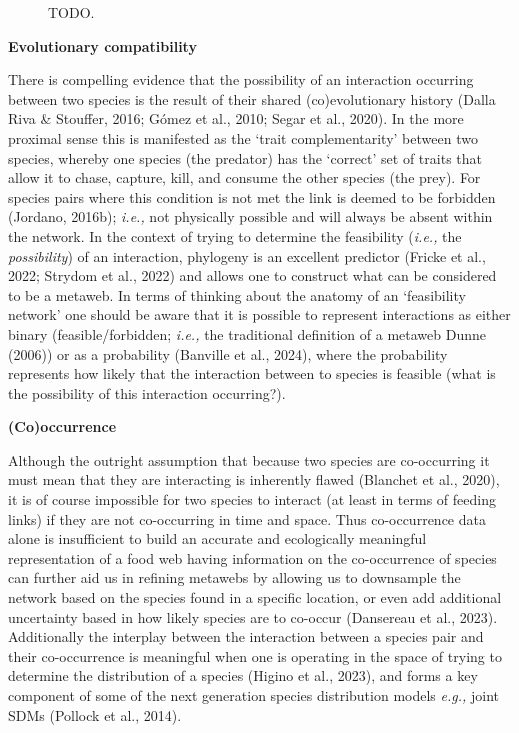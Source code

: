 \documentclass[
]{article}
\begin{document}
\begin{figure}


\caption{\label{fig-feasibility}TODO.}

\end{figure}%

\textbf{Evolutionary compatibility}

There is compelling evidence that the possibility of an interaction
occurring between two species is the result of their shared
(co)evolutionary history (Dalla Riva \& Stouffer, 2016; Gómez et al.,
2010; Segar et al., 2020). In the more proximal sense this is manifested
as the `trait complementarity' between two species, whereby one species
(the predator) has the `correct' set of traits that allow it to chase,
capture, kill, and consume the other species (the prey). For species
pairs where this condition is not met the link is deemed to be forbidden
(Jordano, 2016b); \emph{i.e.,} not physically possible and will always
be absent within the network. In the context of trying to determine the
feasibility (\emph{i.e.,} the \emph{possibility}) of an interaction,
phylogeny is an excellent predictor (Fricke et al., 2022; Strydom et
al., 2022) and allows one to construct what can be considered to be a
metaweb. In terms of thinking about the anatomy of an `feasibility
network' one should be aware that it is possible to represent
interactions as either binary (feasible/forbidden; \emph{i.e.,} the
traditional definition of a metaweb Dunne (2006)) or as a probability
(Banville et al., 2024), where the probability represents how likely
that the interaction between to species is feasible (what is the
possibility of this interaction occurring?).

\textbf{(Co)occurrence}

Although the outright assumption that because two species are
co-occurring it must mean that they are interacting is inherently flawed
(Blanchet et al., 2020), it is of course impossible for two species to
interact (at least in terms of feeding links) if they are not
co-occurring in time and space. Thus co-occurrence data alone is
insufficient to build an accurate and ecologically meaningful
representation of a food web having information on the co-occurrence of
species can further aid us in refining metawebs by allowing us to
downsample the network based on the species found in a specific
location, or even add additional uncertainty based in how likely species
are to co-occur (Dansereau et al., 2023). Additionally the interplay
between the interaction between a species pair and their co-occurrence
is meaningful when one is operating in the space of trying to determine
the distribution of a species (Higino et al., 2023), and forms a key
component of some of the next generation species distribution models
\emph{e.g.,} joint SDMs (Pollock et al., 2014).
\end{document}
